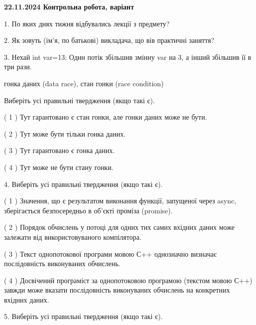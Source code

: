\documentclass[12pt, ukrainian]{article}
\begin{document}
\vspace{4mm}
\newpage
\begin {large}

\textbf{22.11.2024 Контрольна робота, варіант  }\par


{
1. По яких днях тижня відбувались лекції з предмету?



\vspace{5mm}
2. Як зовуть (ім'я, по батькові) викладача, що вів практичні заняття?



\vspace{5mm}
3. Нехай int var=13; Один потік збільшив змінну var на 3, а інший збільшив її в три рази.

гонка даних (data race), стан гонки (race condition)

Виберіть усі правильні твердження (якщо такі є).\par
\vspace{2mm}
( 1 ) Тут гарантовано є стан гонки, але гонки даних може не бути.%

( 2 ) Тут може бути тільки гонка даних.%

( 3 ) Тут гарантовано є гонка даних.%

( 4 ) Тут може не бути стану гонки.%


\vspace{5mm}
4. Виберіть усі правильні твердження (якщо такі є).\par
\vspace{2mm}

( 1 ) Значення, що є результатом виконання функції, запущеної через async, зберігається безпосередньо в об’єкті проміза (promise).%

( 2 ) Порядок обчислень у потоці для одних тих самих вхідних даних може залежати від використовуваного компілятора.%

( 3 ) Текст однопотокової програми мовою С++ однозначно визначає послідовність виконуваних обчислень.%

( 4 ) Досвічений програміст за однопотоковою програмою (текстом мовою С++) завжди може вказати послідовність виконуваних обчислень на конкретних вхідних даних.%


\vspace{5mm}
5. Виберіть усі правильні твердження (якщо такі є).\par
\vspace{2mm}

}
\end{large}
\end{document}
